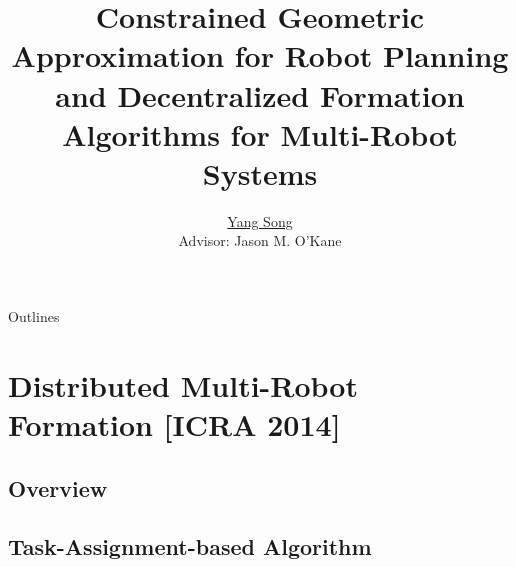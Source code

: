 \documentclass[10pt]{beamer}
\title[Ph.D. Defense]{Constrained Geometric Approximation for Robot Planning and  Decentralized Formation Algorithms for Multi-Robot Systems}
\author[Yang Song]{
  \underline{Yang Song}\\
  Advisor: Jason M. O'Kane
}
\institute[
USC
] %
{ %
  Dept. of Computer Science and Engineering\\
  University of South Carolina
  
}
\begin{document}
\begin{frame}
  \titlepage
\end{frame}
\begin{frame}{Outlines}{}
\tableofcontents
\end{frame}


\section{Distributed Multi-Robot Formation [ICRA 2014]}
\subsection[Overview]{Overview}















\subsection[Lattice Formation]{Task-Assignment-based Algorithm}







\end{document}
